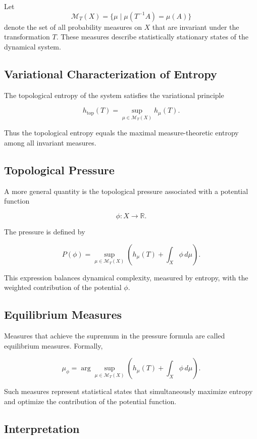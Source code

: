 \documentclass[12pt]{article}
\begin{document}
Let
\[
\mathcal{M}_T(X)=\{\mu \mid \mu(T^{-1}A)=\mu(A)\}
\]
denote the set of all probability measures on $X$ that are invariant under the transformation $T$. These measures describe statistically stationary states of the dynamical system.

\subsection{Variational Characterization of Entropy}

The topological entropy of the system satisfies the variational principle

\[
h_{\mathrm{top}}(T)
=
\sup_{\mu \in \mathcal{M}_T(X)} h_\mu(T).
\]

Thus the topological entropy equals the maximal measure-theoretic entropy among all invariant measures.

\subsection{Topological Pressure}

A more general quantity is the topological pressure associated with a potential function

\[
\phi : X \rightarrow \mathbb{R}.
\]

The pressure is defined by

\[
P(\phi)
=
\sup_{\mu \in \mathcal{M}_T(X)}
\left(
h_\mu(T)+\int_X \phi\, d\mu
\right).
\]

This expression balances dynamical complexity, measured by entropy, with the weighted contribution of the potential $\phi$.

\subsection{Equilibrium Measures}

Measures that achieve the supremum in the pressure formula are called equilibrium measures. Formally,

\[
\mu_\phi
=
\arg\sup_{\mu \in \mathcal{M}_T(X)}
\left(
h_\mu(T)+\int_X \phi\, d\mu
\right).
\]

Such measures represent statistical states that simultaneously maximize entropy and optimize the contribution of the potential function.

\subsection{Interpretation}
\end{document}
